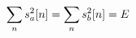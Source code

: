 \documentclass[preview]{standalone}
\begin{document}
\begin{align*}
\special{dvisvgm:raw <g id='unique000'>}\sum_n s_a^2[n]=\sum_n s_b^2[n]=E\special{dvisvgm:raw </g>}
\end{align*}
\end{document}
